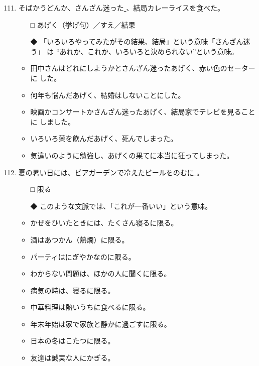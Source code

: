 \documentclass[
uplatex,
b5paper,
10pt,
dvipdfmx
]{jsbook}
\begin{document}
\begin{enumerate}
\setcounter{enumi}{110}

\item そばかうどんか、さんざん迷った\underline{   }、結局カレーライスを食べた。
\begin{itemize}
\item[□] あげく（挙げ句）／すえ／結果
\item[◆] 「いろいろやってみたがその結果、結局」という意味「さんざん迷う」
	  は ``あれか、これか、いろいろと決められない''という意味。
\end{itemize}
\begin{itemize}
\item 田中さんはどれにしようかとさんざん迷ったあげく、赤い色のセーターに
      した。
\item 何年も悩んだあげく、結婚はしないことにした。
\item 映画かコンサートかさんざん迷ったあげく、結局家でテレビを見ることに
      しました。
\item いろいろ薬を飲んだあげく、死んでしまった。
\item 気違いのように勉強し、あげくの果てに本当に狂ってしまった。
\end{itemize}

\item 夏の暑い日には、ビアガーデンで冷えたビールをのむに\underline{    }。
\begin{itemize}
\item[□] 限る
\item[◆] このような文脈では、「これが一番いい」という意味。 
\end{itemize}
\begin{itemize}
\item かぜをひいたときには、たくさん寝るに限る。
\item 酒はあつかん（熱燗）に限る。
\item パーティはにぎやかなのに限る。
\item わからない問題は、ほかの人に聞くに限る。
\item 病気の時は、寝るに限る。
\item 中華料理は熱いうちに食べるに限る。
\item 年末年始は家で家族と静かに過ごすに限る。
\item 日本の冬はこたつに限る。
\item 友達は誠実な人にかぎる。
\end{itemize}


\end{enumerate}
\end{document}
